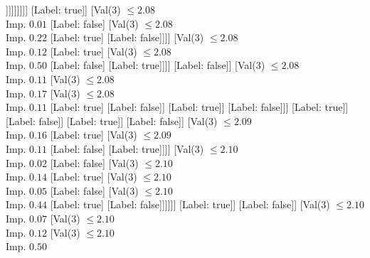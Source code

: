 \documentclass[margin=10pt]{standalone}
\begin{document}
\begin{forest}
																														[Label: false]
																														[Val($3$) $ \leq 2.07$ \\ Imp. $0.44$
																															[Label: true]
																															[Label: false]]]]]]]]]
																							[Label: true]]
																						[Val($3$) $ \leq 2.08$ \\ Imp. $0.01$
																							[Label: false]
																							[Val($3$) $ \leq 2.08$ \\ Imp. $0.22$
																								[Label: true]
																								[Label: false]]]]
																					[Val($3$) $ \leq 2.08$ \\ Imp. $0.12$
																						[Label: true]
																						[Val($3$) $ \leq 2.08$ \\ Imp. $0.50$
																							[Label: false]
																							[Label: true]]]]
																				[Label: false]]
																			[Val($3$) $ \leq 2.08$ \\ Imp. $0.11$
																				[Val($3$) $ \leq 2.08$ \\ Imp. $0.17$
																					[Val($3$) $ \leq 2.08$ \\ Imp. $0.11$
																						[Label: true]
																						[Label: false]]
																					[Label: true]]
																				[Label: false]]]
																		[Label: true]]
																	[Label: false]]
																[Label: true]]
															[Label: false]]
														[Val($3$) $ \leq 2.09$ \\ Imp. $0.16$
															[Label: true]
															[Val($3$) $ \leq 2.09$ \\ Imp. $0.11$
																[Label: false]
																[Label: true]]]]
													[Val($3$) $ \leq 2.10$ \\ Imp. $0.02$
														[Label: false]
														[Val($3$) $ \leq 2.10$ \\ Imp. $0.14$
															[Label: true]
															[Val($3$) $ \leq 2.10$ \\ Imp. $0.05$
																[Label: false]
																[Val($3$) $ \leq 2.10$ \\ Imp. $0.44$
																	[Label: true]
																	[Label: false]]]]]]
												[Label: true]]
											[Label: false]]
										[Val($3$) $ \leq 2.10$ \\ Imp. $0.07$
											[Val($3$) $ \leq 2.10$ \\ Imp. $0.12$
												[Val($3$) $ \leq 2.10$ \\ Imp. $0.50$

\end{forest}
\end{document}
